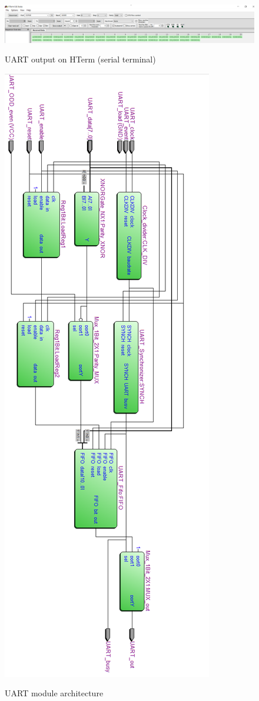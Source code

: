 \begin{figure}[H]
\centering
\includegraphics[scale=.4]{Immagini/22}
\label{22}
\caption{UART output on HTerm (serial terminal)}
\end{figure}

\begin{figure}[H]
\centering
\includegraphics[scale=.7]{Immagini/24}
\label{24}
\caption{UART module architecture}
\end{figure}
